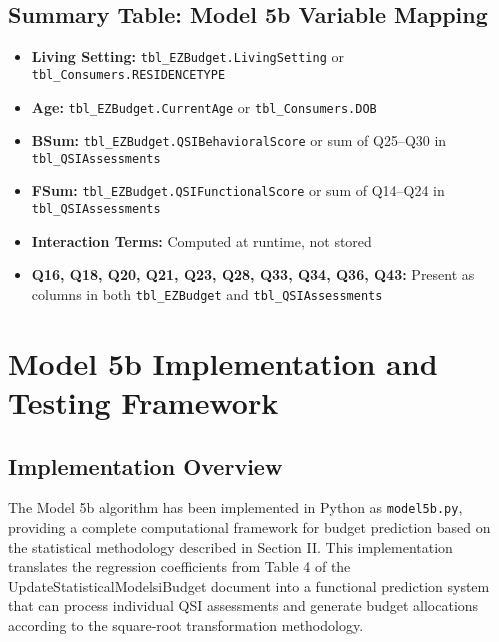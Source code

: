 \subsection{Summary Table: Model 5b Variable Mapping}
\begin{itemize}
    \item \textbf{Living Setting:} \texttt{tbl\_EZBudget.LivingSetting} or \texttt{tbl\_Consumers.RESIDENCETYPE}
    \item \textbf{Age:} \texttt{tbl\_EZBudget.CurrentAge} or \texttt{tbl\_Consumers.DOB}
    \item \textbf{BSum:} \texttt{tbl\_EZBudget.QSIBehavioralScore} or sum of Q25--Q30 in \texttt{tbl\_QSIAssessments}
    \item \textbf{FSum:} \texttt{tbl\_EZBudget.QSIFunctionalScore} or sum of Q14--Q24 in \texttt{tbl\_QSIAssessments}
    \item \textbf{Interaction Terms:} Computed at runtime, not stored
    \item \textbf{Q16, Q18, Q20, Q21, Q23, Q28, Q33, Q34, Q36, Q43:} Present as columns in both \texttt{tbl\_EZBudget} and \texttt{tbl\_QSIAssessments}
\end{itemize}



\section{Model 5b Implementation and Testing Framework}

\subsection{Implementation Overview}

The Model 5b algorithm has been implemented in Python as \texttt{model5b.py}, providing a complete computational framework for budget prediction based on the statistical methodology described in Section II. This implementation translates the regression coefficients from Table 4 of the UpdateStatisticalModelsiBudget document into a functional prediction system that can process individual QSI assessments and generate budget allocations according to the square-root transformation methodology.

